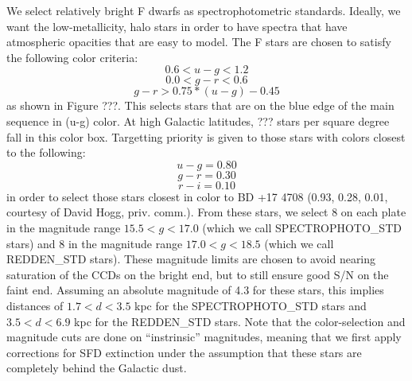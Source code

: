 \documentclass[12pt,preprint]{aastex}
\begin{document}
We select relatively bright F dwarfs as spectrophotometric 
standards.  Ideally, we want the low-metallicity, halo stars in order 
to have spectra that have atmospheric opacities that are easy to model.
The F stars are chosen to satisfy the following color criteria:
$$ 0.6 < u-g < 1.2 $$
$$ 0.0 < g-r < 0.6 $$
$$ g-r > 0.75 * (u-g) - 0.45 $$
as shown in Figure ???.
This selects stars that are on the blue edge of the main
sequence in (u-g) color.  At high Galactic latitudes,
??? stars per square degree fall in this color box.
Targetting priority is given to
those stars with colors closest to the following:
$$ u-g = 0.80 $$
$$ g-r = 0.30 $$
$$ r-i = 0.10 $$
in order to select those stars closest in color to BD +17 4708 
(0.93, 0.28, 0.01, courtesy of David Hogg, priv. comm.).
From these stars, we select 8 on each plate in the magnitude
range $15.5 < g < 17.0$ (which we call SPECTROPHOTO\_STD stars)
and 8 in the magnitude range $17.0 < g < 18.5$ (which we call
REDDEN\_STD stars).
These magnitude limits are chosen to avoid nearing saturation
of the CCDs on the bright end, but to still ensure good S/N
on the faint end.
Assuming an absolute magnitude of 4.3 for these stars, this
implies distances of $1.7 < d < 3.5$ kpc for the SPECTROPHOTO\_STD
stars and $3.5 < d < 6.9$ kpc for the REDDEN\_STD stars.
Note that the color-selection and magnitude cuts are done on
``instrinsic'' magnitudes, meaning that we first apply corrections
for SFD extinction under the assumption that these stars are
completely behind the Galactic dust.
\end{document}
